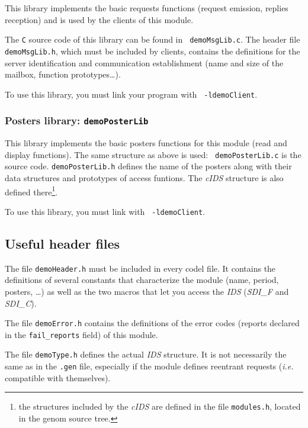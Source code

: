 This library implements  the basic requests  functions (request emission,
replies reception) and is used by the clients of this module.

The {\tt   C}  source code    of  this  library  can be   found  in  {\tt
demoMsgLib.c}.  The header
file {\tt demoMsgLib.h}, which must  be included by clients, contains the
definitions for the server identification and communication establishment
(name and size of the mailbox, function prototypes\ldots).

To use this  library, you must link your  program with  {\tt
-ldemoClient}. 


\subsubsection{Posters library: {\tt demoPosterLib}}

This library implements the basic posters functions for this module (read
and display   functions).  The same    structure as above  is used:  {\tt
demoPosterLib.c} is  the  source code. 
{\tt demoPosterLib.h}   defines the name  of  the
posters along  with  their data structures and prototypes of access
funtions.
The  {\em cIDS} structure is
also defined there\footnote{the structures included by the {\em cIDS} are
defined in the file {\tt modules.h}, located in the genom source tree.}.

To  use this library,  you must link  with  {\tt 
-ldemoClient}.


\subsection{Useful header files}

The file {\tt  demoHeader.h} must  be included  in every  codel file.  It
contains the definitions of several constants that characterize the module
(name, period, posters, \ldots)  as well as the two  macros that let  you
access the {\em IDS} ({\em SDI\_F} and {\em SDI\_C}).

The file  {\tt demoError.h} contains the  definitions of the  error codes
(reports declared in the {\tt fail\_reports} field) of this module.

The file {\tt  demoType.h} defines the actual {\em  IDS} structure. It is
not necessarily the same as  in the  {\tt .gen}  file, especially if  the
module   defines   reentrant   requests   ({\em  i.e.}   compatible  with
themselves).


